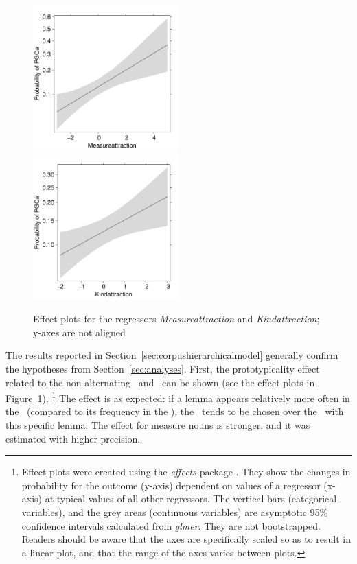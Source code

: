 \begin{figure}[h!]
  \centering
  \includegraphics[width=0.5\textwidth]{../R/output/corpus_Measureattraction}~\includegraphics[width=0.5\textwidth]{../R/output/corpus_Kindattraction}
  \caption{Effect plots for the regressors \textit{Measureattraction} and \textit{Kindattraction}; y-axes are not aligned}
  \label{fig:eff:attraction}
\end{figure}

The results reported in Section~\ref{sec:corpushierarchicalmodel} generally confirm the hypotheses from Section~\ref{sec:analyses}.
First, the prototypicality effect related to the non-alternating \PGCd\ and \NACb\ can be shown (see the effect plots in Figure~\ref{fig:eff:attraction}).%
\footnote{Effect plots were created using the \textit{effects} package \citep{Fox2003}.
They show the changes in probability for the outcome (y-axis) dependent on values of a regressor (x-axis) at typical values of all other regressors.
The vertical bars (categorical variables), and the grey areas (continuous variables) are asymptotic 95\% confidence intervals calculated from \textit{glmer}.
They are not bootstrapped.
Readers should be aware that the axes are specifically scaled so as to result in a linear plot, and that the range of the axes varies between plots.}
The effect is as expected:
if a lemma appears relatively more often in the \PGCd\ (compared to its frequency in the \NACb), the \PGCa\ tends to be chosen over the \NACa\ with this specific lemma.
The effect for measure nouns is stronger, and it was estimated with higher precision.

